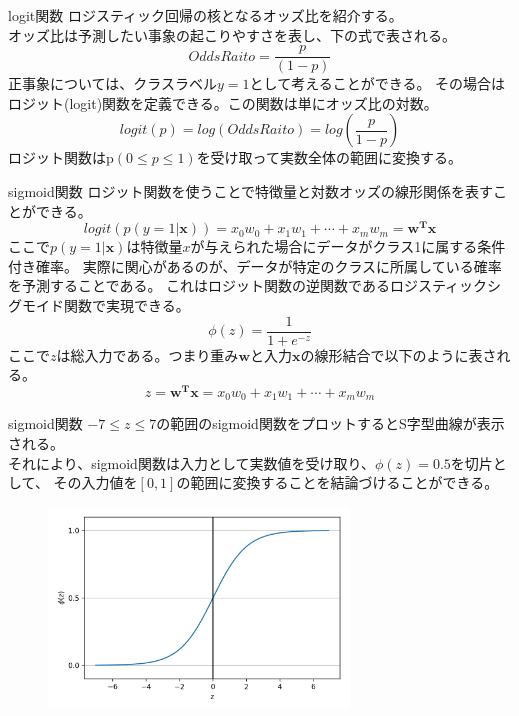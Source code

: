 \documentclass[aspectratio=169, dvipdfmx, 11pt]{beamer} %
\begin{document}
\begin{frame}{logit関数}
    ロジスティック回帰の核となるオッズ比を紹介する。\\
    オッズ比は予測したい事象の起こりやすさを表し、下の式で表される。
    \begin{equation*}
        Odds Raito = \frac{p}{(1-p)}
    \end{equation*}
    正事象については、クラスラベル\(y=1\)として考えることができる。
    その場合はロジット(logit)関数を定義できる。この関数は単にオッズ比の対数。
    \begin{equation*}
        logit(p) = log(OddsRaito) = log(\frac{p}{1-p})
    \end{equation*}
    ロジット関数はp\((0\leq p \leq 1)\)を受け取って実数全体の範囲に変換する。
\end{frame} 

\begin{frame}{sigmoid関数}
    ロジット関数を使うことで特徴量と対数オッズの線形関係を表すことができる。
    \begin{equation*}
        logit(p(y=1|\textbf{x})) = x_0w_0 + x_1w_1 + \cdots  + x_mw_m = \mathbf{w^T}\mathbf{x}
    \end{equation*}
    ここで\(p(y=1|\textbf{x})\)は特徴量\(x\)が与えられた場合にデータがクラス1に属する条件付き確率。
    実際に関心があるのが、データが特定のクラスに所属している確率を予測することである。
    これはロジット関数の逆関数であるロジスティックシグモイド関数で実現できる。
    \begin{equation*}
        \phi(z) = \frac{1}{1+e^{-z}}
    \end{equation*}
    ここで\(z\)は総入力である。つまり重み\(\textbf{w}\)と入力\(\textbf{x}\)の線形結合で以下のように表される。
    \begin{equation*}
        z = \mathbf{w^T}\mathbf{x} = x_0w_0 + x_1w_1 + \cdots  + x_mw_m
    \end{equation*}
\end{frame}

\begin{frame}{sigmoid関数}
    \(-7 \leq z \leq  7\)の範囲のsigmoid関数をプロットするとS字型曲線が表示される。 \\
    それにより、sigmoid関数は入力として実数値を受け取り、\(\phi(z)=0.5\)を切片として、
    その入力値を\([0, 1]\)の範囲に変換することを結論づけることができる。
    \begin{figure}[b]
        \begin{center}
        \includegraphics[width=80mm]{img/day02/fig02.png}
        \end{center}
    \end{figure}
\end{frame}
\end{document}
